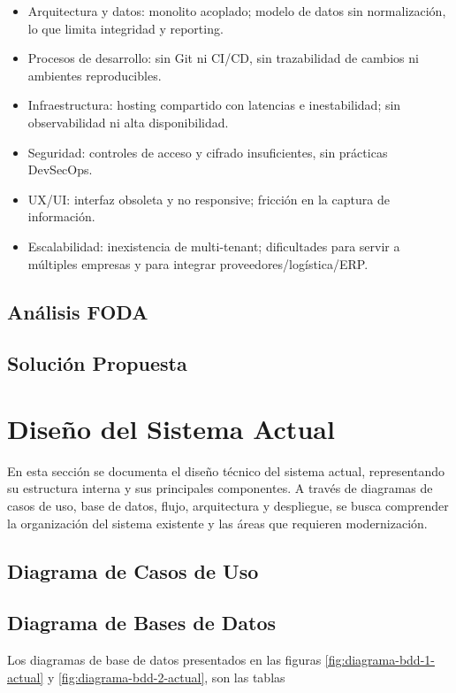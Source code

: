 \begin{itemize}
\item Arquitectura y datos: monolito acoplado; modelo de datos sin normalización, lo que limita integridad y reporting.
\item Procesos de desarrollo: sin Git ni CI/CD, sin trazabilidad de cambios ni ambientes reproducibles.
\item Infraestructura: hosting compartido con latencias e inestabilidad; sin observabilidad ni alta disponibilidad.
\item Seguridad: controles de acceso y cifrado insuficientes, sin prácticas DevSecOps.
\item UX/UI: interfaz obsoleta y no responsive; fricción en la captura de información.
\item Escalabilidad: inexistencia de multi-tenant; dificultades para servir a múltiples empresas y para integrar proveedores/logística/ERP.
\end{itemize}

\subsection{Análisis FODA}

\subsection{Solución Propuesta}

\section{Diseño del Sistema Actual}

En esta sección se documenta el diseño técnico del sistema actual, representando su estructura interna y sus principales componentes. A través de diagramas de casos de uso, base de datos, flujo, arquitectura y despliegue, se busca comprender la organización del sistema existente y las áreas que requieren modernización.


\subsection{Diagrama de Casos de Uso}

\subsection{Diagrama de Bases de Datos}

Los diagramas de base de datos presentados en las figuras \ref{fig:diagrama-bdd-1-actual} y \ref{fig:diagrama-bdd-2-actual}, son las tablas 

